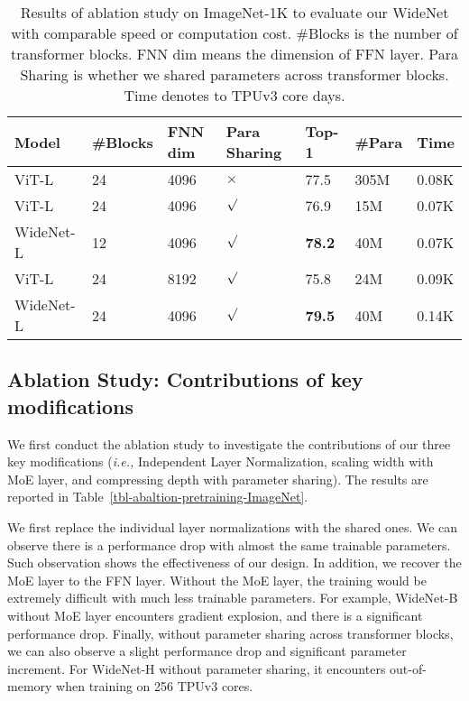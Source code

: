 \documentclass[letterpaper]{article} \usepackage{aaai22}  \usepackage{times}  \usepackage{helvet}  \usepackage{courier}  \usepackage[hyphens]{url}  \usepackage{graphicx} \urlstyle{rm} \def\UrlFont{\rm}  \usepackage{natbib}  \usepackage{caption} \DeclareCaptionStyle{ruled}{labelfont=normalfont,labelsep=colon,strut=off} \frenchspacing  \setlength{\pdfpagewidth}{8.5in}  \setlength{\pdfpageheight}{11in}  \usepackage{algorithm}
\newcommand{\ie}{\emph{i.e.,}\xspace}
\begin{document}
\begin{table*}[t]
\centering
\caption{Results of ablation study on ImageNet-1K to evaluate our WideNet with comparable speed or computation cost. \#Blocks is the number of transformer blocks. FNN dim means the dimension of FFN layer. Para Sharing is whether we shared parameters across transformer blocks. Time denotes to TPUv3 core days.}
\label{tbl-abaltion-2-pretraining-ImageNet}
\begin{tabular}{l|llllll}
\toprule
Model                    & \#Blocks    & FNN dim   & Para Sharing   & Top-1 & \#Para & Time \\ \midrule
ViT-L                     & 24     & 4096    & $\times$  & 77.5 & 305M       & 0.08K         \\
ViT-L                     & 24     & 4096    & $\surd$  & 76.9 & 15M       & 0.07K         \\
WideNet-L                 & 12     & 4096    & $\surd$  & \textbf{78.2} & 40M        & 0.07K          \\ \midrule
ViT-L    & 24     & 8192   & $\surd$  & 75.8 & 24M        & 0.09K         \\
WideNet-L                   & 24    & 4096   & $\surd$  & \textbf{79.5} & 40M        & 0.14K       \\
\bottomrule
\end{tabular}
\end{table*}





\subsection{Ablation Study: Contributions of key modifications}
We first conduct the ablation study to investigate the contributions of our three key modifications (\ie Independent Layer Normalization, scaling width with MoE layer, and compressing depth with parameter sharing). The results are reported in Table~\ref{tbl-abaltion-pretraining-ImageNet}. 


We first replace the individual layer normalizations with the shared ones. We can observe there is a performance drop with almost the same trainable parameters. Such observation shows the effectiveness of our design. In addition, we recover the MoE layer to the FFN layer. Without the MoE layer, the training would be extremely difficult with much less trainable parameters. For example, WideNet-B without MoE layer encounters gradient explosion, and there is a significant performance drop. Finally, without parameter sharing across transformer blocks, we can also observe a slight performance drop and significant parameter increment. For WideNet-H without parameter sharing, it encounters out-of-memory when training on 256 TPUv3 cores. 
\end{document}
